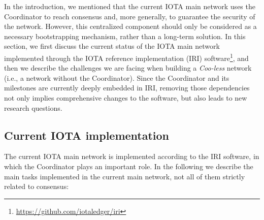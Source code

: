 \documentclass[../main.tex]{subfiles}
\begin{document}
In the introduction, we mentioned that the current IOTA main network uses the Coordinator to reach consensus and, more generally, to guarantee the security of the network. However, this centralized component should only be considered as a necessary bootstrapping mechanism, rather than a long-term solution. In this section, we first discuss the current status of the IOTA main network implemented through the IOTA reference implementation (IRI) software\footnote{\url{https://github.com/iotaledger/iri}}, and then we describe the challenges we are facing when building a \textit{Coo-less} network (i.e., a network without the Coordinator). Since the Coordinator and its milestones are currently deeply embedded in IRI, removing those dependencies not only implies comprehensive changes to the software, but also leads to new research questions.

\subsection{Current IOTA implementation}\label{sec:coo-dep}

The current IOTA main network is implemented according to the IRI software, in which the Coordinator plays an important role. In the following we describe the main tasks implemented in the current main network, not all of them strictly related to consensus:
\end{document}

